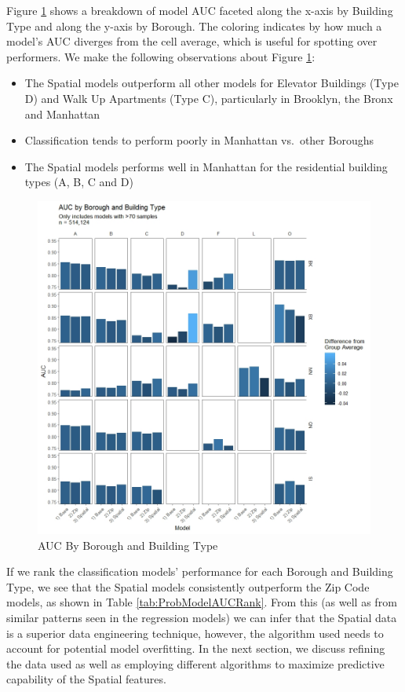 \documentclass[12pt,]{article}
\providecommand{\tightlist}{%
  \setlength{\itemsep}{0pt}\setlength{\parskip}{0pt}}
\begin{document}
Figure \ref{fig:AUC by boro and build type} shows a breakdown of model
AUC faceted along the x-axis by Building Type and along the y-axis by
Borough. The coloring indicates by how much a model's AUC diverges from
the cell average, which is useful for spotting over performers. We make
the following observations about Figure
\ref{fig:AUC by boro and build type}:

\begin{itemize}
\tightlist
\item
  The Spatial models outperform all other models for Elevator Buildings
  (Type D) and Walk Up Apartments (Type C), particularly in Brooklyn,
  the Bronx and Manhattan
\item
  Classification tends to perform poorly in Manhattan vs.~other Boroughs
\item
  The Spatial models performs well in Manhattan for the residential
  building types (A, B, C and D)
\end{itemize}

\begin{figure}[H]
\includegraphics[width=1\linewidth]{Sections/tables and figures/AUC by boro and build type} \caption{AUC By Borough and Building Type}\label{fig:AUC by boro and build type}
\end{figure}

If we rank the classification models' performance for each Borough and
Building Type, we see that the Spatial models consistently outperform
the Zip Code models, as shown in Table \ref{tab:ProbModelAUCRank}. From
this (as well as from similar patterns seen in the regression models) we
can infer that the Spatial data is a superior data engineering
technique, however, the algorithm used needs to account for potential
model overfitting. In the next section, we discuss refining the data
used as well as employing different algorithms to maximize predictive
capability of the Spatial features.
\end{document}
